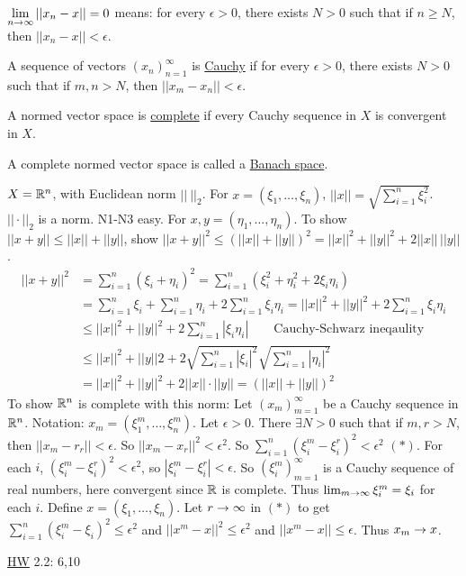 \documentclass[]{article}
\begin{document}
\begin{recall}
	$\displaystyle\lim_{n\rightarrow\infty} ||x_n-x||=0$ means: for every $\epsilon>0$, there exists $N>0$ such that if $n\geq N$, then $||x_n-x||<\epsilon$.
\end{recall}

\begin{definition}
	A sequence of vectors $(x_n)_{n=1}^\infty$ is \ul{Cauchy} if for every $\epsilon>0$, there exists $N>0$ such that if $m,n>N$, then $||x_m-x_n||<\epsilon$.
\end{definition}
\begin{definition}
	A normed vector space is \ul{complete} if every Cauchy sequence in $X$ is convergent in $X$.
\end{definition}
\begin{definition}
	A complete normed vector space is called a \ul{Banach space}.
\end{definition}

\begin{example}
	$X = \mathbb{R}^n$, with Euclidean norm $||\ ||_2$. For $x=(\xi_1,\dots,\xi_n)$, $||x|| = \sqrt{\sum_{i=1}^n \xi_i^2}$. $||\cdot||_2$ is a norm. N1-N3 easy.
	For $x,y=(\eta_1,\dots,\eta_n)$.
	To show $||x+y|| \leq ||x||+||y||$, show $||x+y||^2 \leq (||x||+||y||)^2 = ||x||^2 + ||y||^2 + 2 ||x||\,||y||$.
	\begin{align*}
		||x+y||^2 &= \sum_{i=1}^n (\xi_i+\eta_i)^2 
				  = \sum_{i=1}^n (\xi_i^2 + \eta_i^2 + 2\xi_i\eta_i) \\
				  &= \sum_{i=1}^n \xi_i + \sum_{i=1}^n \eta_i + 2\sum_{i=1}^n \xi_i\eta_i
				  = ||x||^2 + ||y||^2 + 2\sum_{i=1}^n \xi_i\eta_i \\
				  &\leq ||x||^2 + ||y||^2 + 2\sum_{i=1}^n |\xi_i\eta_i| \qquad \text{Cauchy-Schwarz ineqaulity}\\
				  &\leq ||x||^2 + ||y||2 + 2\sqrt{\sum_{i=1}^n|\xi_i|^2} \sqrt{\sum_{i=1}^n|\eta_i|^2} \\
				  &= ||x||^2 + ||y||^2 + 2||x||\cdot||y|| = (||x||+||y||)^2
	\end{align*}
	To show $\mathbb{R}^n$ is complete with this norm:
	Let $(x_m)_{m=1}^\infty$ be a Cauchy sequence in $\mathbb{R}^n$.
	Notation: $x_m = (\xi_1^m,\dots,\xi_n^m)$.
	Let $\epsilon>0$. There $\exists N>0$ such that if $m,r>N$, then $||x_m-r_r||<\epsilon$.
	So $||x_m-x_r||^2 < \epsilon^2$.
	So $\sum_{i=1}^n (\xi_i^m-\xi_i^r)^2 < \epsilon^2$ $(*)$.
	For each $i$, $(\xi_i^m-\xi_i^r)^2<\epsilon^2$, so $|\xi_i^m-\xi_i^r|<\epsilon$.
	So $(\xi_i^m)_{m=1}^\infty$ is a Cauchy sequence of real numbers, here convergent since $\mathbb{R}$ is complete.
	Thus $\lim_{m\rightarrow\infty} \xi_i^m = \xi_i$ for each $i$.
	Define $x = (\xi_1,\dots,\xi_n)$.
	Let $r\rightarrow\infty$ in $(*)$ to get $\sum_{i=1}^n(\xi_i^m-\xi_i)^2\leq\epsilon^2$ and $||x^m-x||^2 \leq \epsilon^2$ and $||x^m-x||\leq \epsilon$.
	Thus $x_m\rightarrow x$.
\end{example}

\ul{HW} 2.2: 6,10
\end{document}
